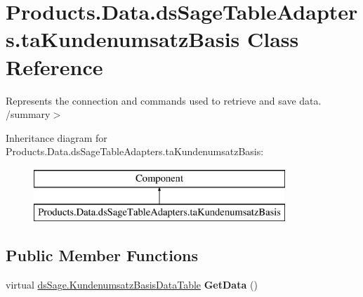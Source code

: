 \hypertarget{class_products_1_1_data_1_1ds_sage_table_adapters_1_1ta_kundenumsatz_basis}{}\section{Products.\+Data.\+ds\+Sage\+Table\+Adapters.\+ta\+Kundenumsatz\+Basis Class Reference}
\label{class_products_1_1_data_1_1ds_sage_table_adapters_1_1ta_kundenumsatz_basis}


Represents the connection and commands used to retrieve and save data. /summary$>$  


Inheritance diagram for Products.\+Data.\+ds\+Sage\+Table\+Adapters.\+ta\+Kundenumsatz\+Basis\+:\begin{figure}[H]
\begin{center}
\leavevmode
\includegraphics[height=2.000000cm]{class_products_1_1_data_1_1ds_sage_table_adapters_1_1ta_kundenumsatz_basis}
\end{center}
\end{figure}
\subsection*{Public Member Functions}
\begin{DoxyCompactItemize}
\item 
virtual \hyperlink{class_products_1_1_data_1_1ds_sage_1_1_kundenumsatz_basis_data_table}{ds\+Sage.\+Kundenumsatz\+Basis\+Data\+Table} {\bfseries Get\+Data} ()\hypertarget{class_products_1_1_data_1_1ds_sage_table_adapters_1_1ta_kundenumsatz_basis_a242685e40c9ea4f0326070fb7d72a565}{}\label{class_products_1_1_data_1_1ds_sage_table_adapters_1_1ta_kundenumsatz_basis_a242685e40c9ea4f0326070fb7d72a565}

\end{DoxyCompactItemize}
